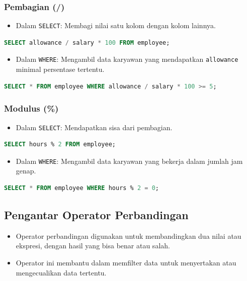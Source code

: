 \documentclass{article}
\begin{document}
\subsubsection{Pembagian (/)}
\begin{itemize}
    \item Dalam \texttt{SELECT}: Membagi nilai satu kolom dengan kolom lainnya.
\end{itemize}
\begin{lstlisting}[language=SQL, caption={Pembagian dalam SELECT}, captionpos=b]
SELECT allowance / salary * 100 FROM employee;
\end{lstlisting}
\begin{itemize}
    \item Dalam \texttt{WHERE}: Mengambil data karyawan yang mendapatkan \texttt{allowance} minimal persentase tertentu.
\end{itemize}
\begin{lstlisting}[language=SQL, caption={Pembagian dalam WHERE}, captionpos=b]
SELECT * FROM employee WHERE allowance / salary * 100 >= 5;
\end{lstlisting}

\subsubsection{Modulus (\%)}
\begin{itemize}
    \item Dalam \texttt{SELECT}: Mendapatkan sisa dari pembagian.
\end{itemize}
\begin{lstlisting}[language=SQL, caption={Modulus dalam SELECT}, captionpos=b]
SELECT hours % 2 FROM employee;
\end{lstlisting}
\begin{itemize}
    \item Dalam \texttt{WHERE}: Mengambil data karyawan yang bekerja dalam jumlah jam genap.
\end{itemize}
\begin{lstlisting}[language=SQL, caption={Modulus dalam WHERE}, captionpos=b]
SELECT * FROM employee WHERE hours % 2 = 0;
\end{lstlisting}

\subsection{Pengantar Operator Perbandingan}
\begin{itemize}
    \item Operator perbandingan digunakan untuk membandingkan dua nilai atau ekspresi, dengan hasil yang bisa benar atau salah.
    \item Operator ini membantu dalam memfilter data untuk menyertakan atau mengecualikan data tertentu.
\end{itemize}
\end{document}
